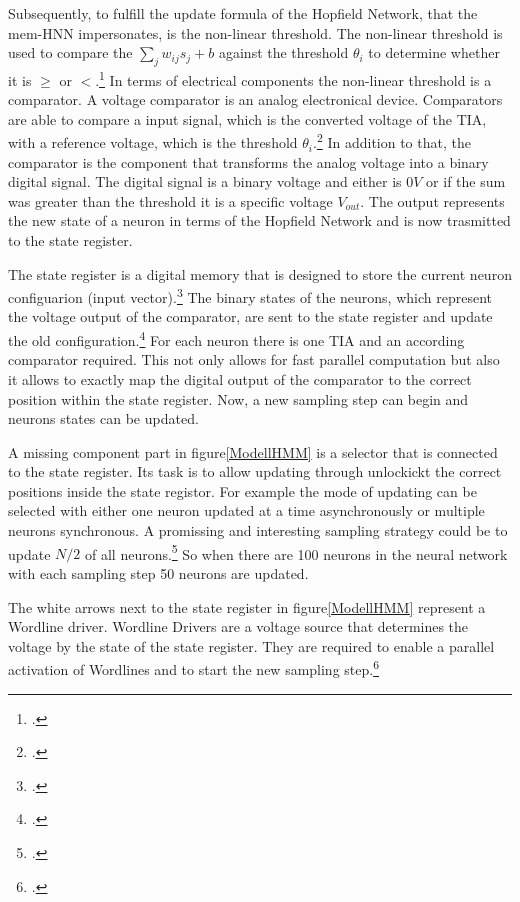 Subsequently, to fulfill the update formula of the Hopfield Network, that the \ac{mem-HNN} impersonates, is the non-linear threshold.
The non-linear threshold is used to compare the \(\sum_j w_{ij} s_j + b\) against the threshold \(\theta_i\) to determine whether it is \(\geq\) or \(<\).\footcite[cf.][18]{caiHarnessingIntrinsicNoise2019}
In terms of electrical components the non-linear threshold is a comparator. 
A voltage comparator is an analog electronical device.
Comparators are able to compare a input signal, which is the converted voltage of the \ac{TIA}, with a reference voltage, which is the threshold \(\theta_i\).\footcite[cf.][28]{chenApplicationVoltageComparator2021}
In addition to that, the comparator is the component that transforms the analog voltage into a binary digital signal.
The digital signal is a binary voltage and either is \(0V\) or if the sum was greater than the threshold it is a specific voltage \(V_{out}\).
The output represents the new state of a neuron in terms of the Hopfield Network and is now trasmitted to the state register.

The state register is a digital memory that is designed to store the current neuron configuarion (input vector).\footcite[cf.][18]{caiHarnessingIntrinsicNoise2019}
The binary states of the neurons, which represent the voltage output of the comparator, are sent to the state register and update the old configuration.\footcite[cf.][3]{caiHarnessingIntrinsicNoise2019}
For each neuron there is one \ac{TIA} and an according comparator required. 
This not only allows for fast parallel computation but also it allows to exactly map the digital output of the comparator to the correct position within the state register.
Now, a new sampling step can begin and neurons states can be updated. 

A missing component part in figure\ref{ModellHMM} is a selector that is connected to the state register. 
Its task is to allow updating through unlockickt the correct positions inside the state registor.  
For example the mode of updating can be selected with either one neuron updated at a time asynchronously or multiple neurons synchronous. 
A promissing and interesting sampling strategy could be to update \(N/2\) of all neurons.\footcite[cf.][3]{hizzaniMemristorbasedHardwareAlgorithms2023}
So when there are 100 neurons in the neural network with each sampling step 50 neurons are updated.

The white arrows next to the state register in figure\ref{ModellHMM} represent a Wordline driver. 
Wordline Drivers are a voltage source that determines the voltage by the state of the state register.
They are required to enable a parallel activation of Wordlines and to start the new sampling step.\footcite[cf.][18]{caiHarnessingIntrinsicNoise2019}

